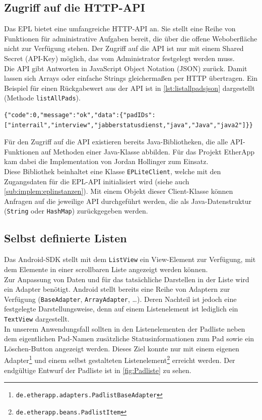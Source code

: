 \subsection{Zugriff auf die HTTP-API}
Das EPL bietet eine umfangreiche HTTP-API an.
Sie stellt eine Reihe von Funktionen für administrative Aufgaben bereit, die über die offene Weboberfläche nicht zur Verfügung stehen.
Der Zugriff auf die API ist nur mit einem Shared Secret (API-Key) möglich, das vom Administrator festgelegt werden muss.\\
Die API gibt Antworten in JavaScript Object Notation (JSON) zurück.
Damit lassen sich Arrays oder einfache Strings gleichermaßen per HTTP übertragen.
Ein Beispiel für einen Rückgabewert aus der API ist in \autoref{lst:listallpadsjson} dargestellt (Methode \texttt{listAllPads}).
\\[1em]
\begin{lstlisting}[caption=Rückgabewert der API zur Methode listAllPads,captionpos=b,label=lst:listallpadsjson]
{"code":0,"message":"ok","data":{"padIDs":["interrail","interview","jabberstatusdienst,"java","Java","java2"]}}
\end{lstlisting}

Für den Zugriff auf die API existieren bereits Java-Bibliotheken, die alle API-Funktionen auf Methoden einer Java-Klasse abbilden.
Für das Projekt EtherApp kam dabei die Implementation von Jordan Hollinger zum Einsatz.\\
Diese Bibliothek beinhaltet eine Klasse \texttt{EPLiteClient}, welche mit den Zugangsdaten für die EPL-API initialisiert wird (siehe auch \autoref{sub:implem:eplinstanzen}).
Mit einem Objekt dieser Client-Klasse können Anfragen auf die jeweilige API durchgeführt werden, die als Java-Datenstruktur (\texttt{String} oder \texttt{HashMap}) zurückgegeben werden.

\subsection{Selbst definierte Listen}
Das Android-SDK stellt mit dem \texttt{ListView} ein View-Element zur Verfügung, mit dem Elemente in einer scrollbaren Liste angezeigt werden können.\\
Zur Anpassung von Daten und für das tatsächliche Darstellen in der Liste wird ein Adapter benötigt.
Android stellt bereits eine Reihe von Adaptern zur Verfügung (\texttt{BaseAdapter}, \texttt{ArrayAdapter}, …).
Deren Nachteil ist jedoch eine festgelegte Darstellungsweise, denn auf einem Listenelement ist lediglich ein \texttt{TextView} dargestellt.\\
In unserem Anwendungsfall sollten in den Listenelementen der Padliste neben dem eigentlichen Pad-Namen zusätzliche Statusinformationen zum Pad sowie ein Löschen-Button angezeigt werden.
Dieses Ziel konnte nur mit einem eigenen Adapter\footnote{\texttt{de.etherapp.adapters.PadlistBaseAdapter}} und einem selbst gestalteten Listenelement\footnote{\texttt{de.etherapp.beans.PadlistItem}} erreicht werden.
Der endgültige Entwurf der Padliste ist in \autoref{fig:Padliste} zu sehen.

